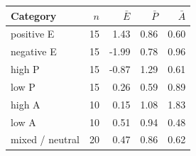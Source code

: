 \begin{tabular}{lrrrr}
\toprule
Category & $n$ & $\bar E$ & $\bar P$ & $\bar A$ \\
\midrule
positive E & 15 & 1.43 & 0.86 & 0.60 \\
negative E & 15 & -1.99 & 0.78 & 0.96 \\
high P & 15 & -0.87 & 1.29 & 0.61 \\
low P & 15 & 0.26 & 0.59 & 0.89 \\
high A & 10 & 0.15 & 1.08 & 1.83 \\
low A & 10 & 0.51 & 0.94 & 0.48 \\
mixed / neutral & 20 & 0.47 & 0.86 & 0.62 \\
\bottomrule
\end{tabular}
